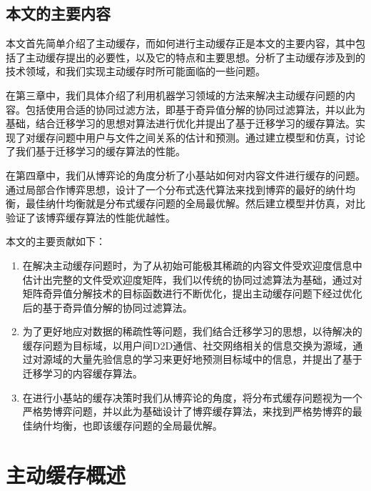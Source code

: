 \documentclass[bachelor]{seuthesis} %
\begin{document}
\begin{Main}
\section{本文的主要内容}
本文首先简单介绍了主动缓存，而如何进行主动缓存正是本文的主要内容，其中包括了主动缓存提出的必要性，以及它的特点和主要思想。分析了主动缓存涉及到的技术领域，和我们实现主动缓存时所可能面临的一些问题。\par
在第三章中，我们具体介绍了利用机器学习领域的方法来解决主动缓存问题的内容。包括使用合适的协同过滤方法，即基于奇异值分解的协同过滤算法，并以此为基础，结合迁移学习的思想对算法进行优化并提出了基于迁移学习的缓存算法。实现了对缓存问题中用户与文件之间关系的估计和预测。通过建立模型和仿真，讨论了我们基于迁移学习的缓存算法的性能。\par
在第四章中，我们从博弈论的角度分析了小基站如何对内容文件进行缓存的问题。通过局部合作博弈思想，设计了一个分布式迭代算法来找到博弈的最好的纳什均衡，最佳纳什均衡就是分布式缓存问题的全局最优解。然后建立模型并仿真，对比验证了该博弈缓存算法的性能优越性。\par
本文的主要贡献如下：
\begin{enumerate}
\item 在解决主动缓存问题时，为了从初始可能极其稀疏的内容文件受欢迎度信息中估计出完整的文件受欢迎度矩阵，我们以传统的协同过滤算法为基础，通过对矩阵奇异值分解技术的目标函数进行不断优化，提出主动缓存问题下经过优化后的基于奇异值分解的协同过滤算法。
\item 为了更好地应对数据的稀疏性等问题，我们结合迁移学习的思想，以待解决的缓存问题为目标域，以用户间D2D通信、社交网络相关的信息交换为源域，通过对源域的大量先验信息的学习来更好地预测目标域中的信息，并提出了基于迁移学习的内容缓存算法。
\item 在进行小基站的缓存决策时我们从博弈论的角度，将分布式缓存问题视为一个严格势博弈问题，并以此为基础设计了博弈缓存算法，来找到严格势博弈的最佳纳什均衡，也即该缓存问题的全局最优解。
\end{enumerate}

\chapter{主动缓存概述}

\end{Main}
\end{document}
